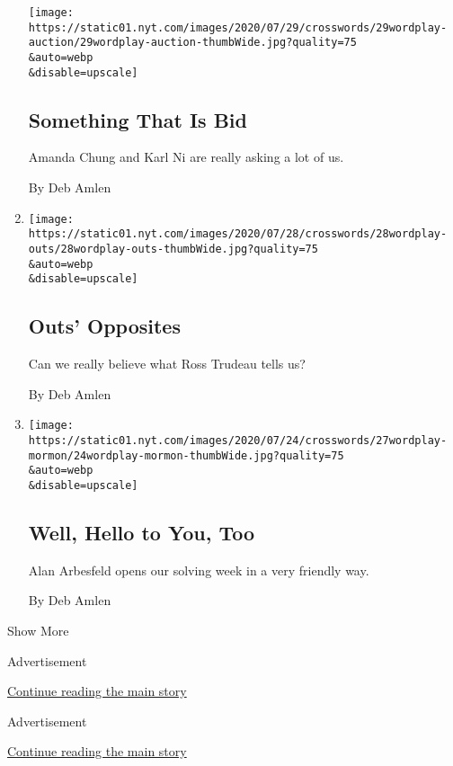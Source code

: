 \begin{enumerate}
  \texttt{[image: https://static01.nyt.com/images/2020/07/29/crosswords/29wordplay-auction/29wordplay-auction-thumbWide.jpg?quality=75\\\&auto=webp\\\&disable=upscale]}

  \hypertarget{something-that-is-bid}{%
  \subsection{Something That Is Bid}\label{something-that-is-bid}}

  Amanda Chung and Karl Ni are really asking a lot of us.

  By Deb Amlen
\item
  \href{/2020/07/27/crosswords/daily-puzzle-2020-07-28.html}{}

  \texttt{[image: https://static01.nyt.com/images/2020/07/28/crosswords/28wordplay-outs/28wordplay-outs-thumbWide.jpg?quality=75\\\&auto=webp\\\&disable=upscale]}

  \hypertarget{outs-opposites}{%
  \subsection{Outs' Opposites}\label{outs-opposites}}

  Can we really believe what Ross Trudeau tells us?

  By Deb Amlen
\item
  \href{/2020/07/26/crosswords/daily-puzzle-2020-07-27.html}{}

  \texttt{[image: https://static01.nyt.com/images/2020/07/24/crosswords/27wordplay-mormon/24wordplay-mormon-thumbWide.jpg?quality=75\\\&auto=webp\\\&disable=upscale]}

  \hypertarget{well-hello-to-you-too}{%
  \subsection{Well, Hello to You, Too}\label{well-hello-to-you-too}}

  Alan Arbesfeld opens our solving week in a very friendly way.

  By Deb Amlen
\end{enumerate}

Show More

Advertisement

\protect\hyperlink{after-mid2}{Continue reading the main story}

Advertisement

\protect\hyperlink{after-mktg}{Continue reading the main story}


